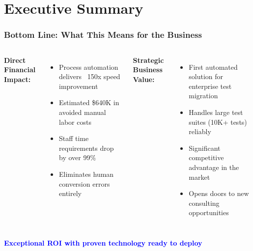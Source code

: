 
\section{Executive Summary}
\begin{frame}
\frametitle{Bottom Line: What This Means for the Business}
\begin{columns}
\textbf{Direct Financial Impact:}
\begin{itemize}
    \item Process automation delivers ~150x speed improvement
    \item Estimated \$640K in avoided manual labor costs
    \item Staff time requirements drop by over 99\%
    \item Eliminates human conversion errors entirely
\end{itemize}

\textbf{Strategic Business Value:}
\begin{itemize}
    \item First automated solution for enterprise test migration
    \item Handles large test suites (10K+ tests) reliably
    \item Significant competitive advantage in the market
    \item Opens doors to new consulting opportunities
\end{itemize}
\end{columns}

\vspace{0.3cm}
\begin{center}
\textcolor{blue}{\textbf{Exceptional ROI with proven technology ready to deploy}}
\end{center}
\end{frame}

